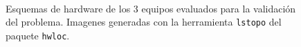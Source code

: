\begin{figure}[]
\centering
\hspace*{\fill}
\hspace*{\fill}
\hspace*{\fill}
\\
\caption{Esquemas de hardware de los 3 equipos evaluados para la validación del problema. Imagenes generadas con la herramienta \texttt{lstopo} del paquete \texttt{hwloc}.}
\end{figure}

